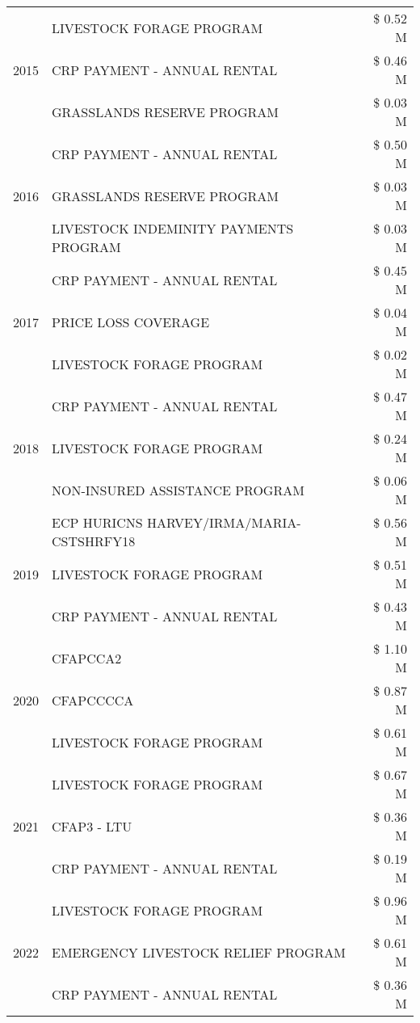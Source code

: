 \begin{tabular}{llr}
\cline{1-3}
\multirow[t]{3}{*}{2015} & LIVESTOCK FORAGE PROGRAM & \$ 0.52 M \\
 & CRP PAYMENT - ANNUAL RENTAL & \$ 0.46 M \\
 & GRASSLANDS RESERVE PROGRAM & \$ 0.03 M \\
\cline{1-3}
\multirow[t]{3}{*}{2016} & CRP PAYMENT - ANNUAL RENTAL & \$ 0.50 M \\
 & GRASSLANDS RESERVE PROGRAM & \$ 0.03 M \\
 & LIVESTOCK INDEMINITY PAYMENTS PROGRAM & \$ 0.03 M \\
\cline{1-3}
\multirow[t]{3}{*}{2017} & CRP PAYMENT - ANNUAL RENTAL & \$ 0.45 M \\
 & PRICE LOSS COVERAGE & \$ 0.04 M \\
 & LIVESTOCK FORAGE PROGRAM & \$ 0.02 M \\
\cline{1-3}
\multirow[t]{3}{*}{2018} & CRP PAYMENT - ANNUAL RENTAL & \$ 0.47 M \\
 & LIVESTOCK FORAGE PROGRAM & \$ 0.24 M \\
 & NON-INSURED ASSISTANCE PROGRAM & \$ 0.06 M \\
\cline{1-3}
\multirow[t]{3}{*}{2019} & ECP HURICNS HARVEY/IRMA/MARIA-CSTSHRFY18 & \$ 0.56 M \\
 & LIVESTOCK FORAGE PROGRAM & \$ 0.51 M \\
 & CRP PAYMENT - ANNUAL RENTAL & \$ 0.43 M \\
\cline{1-3}
\multirow[t]{3}{*}{2020} & CFAPCCA2 & \$ 1.10 M \\
 & CFAPCCCCA & \$ 0.87 M \\
 & LIVESTOCK FORAGE PROGRAM & \$ 0.61 M \\
\cline{1-3}
\multirow[t]{3}{*}{2021} & LIVESTOCK FORAGE PROGRAM & \$ 0.67 M \\
 & CFAP3 - LTU & \$ 0.36 M \\
 & CRP PAYMENT - ANNUAL RENTAL & \$ 0.19 M \\
\cline{1-3}
\multirow[t]{3}{*}{2022} & LIVESTOCK FORAGE PROGRAM & \$ 0.96 M \\
 & EMERGENCY LIVESTOCK RELIEF PROGRAM & \$ 0.61 M \\
 & CRP PAYMENT - ANNUAL RENTAL & \$ 0.36 M \\
\cline{1-3}
\bottomrule
\end{tabular}

